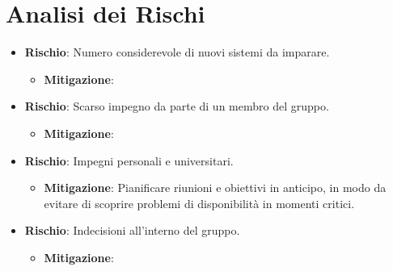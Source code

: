 \documentclass[a4paper,12pt]{article}
\begin{document}
\section{Analisi dei Rischi}
\begin{itemize}
    \item \textbf{Rischio}: Numero considerevole di nuovi sistemi da imparare.
        \begin{itemize}
            \item \textbf{Mitigazione}: 
        \end{itemize}

    \item \textbf{Rischio}: Scarso impegno da parte di un membro del gruppo.
        \begin{itemize}
            \item \textbf{Mitigazione}: 
        \end{itemize}

    \item \textbf{Rischio}: Impegni personali e universitari.
        \begin{itemize}
            \item \textbf{Mitigazione}: Pianificare riunioni e obiettivi in anticipo, in modo da evitare di scoprire problemi di disponibilità in momenti critici. 
        \end{itemize}

    \item \textbf{Rischio}: Indecisioni all'interno del gruppo.
        \begin{itemize}
            \item \textbf{Mitigazione}: 
        \end{itemize}
\end{itemize}

\end{document}
